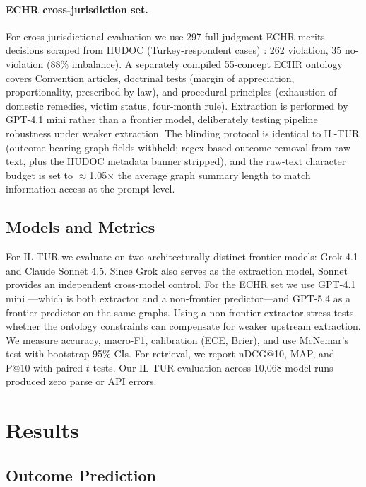 \documentclass[11pt]{article}
\begin{document}
\paragraph{ECHR cross-jurisdiction set.}
For cross-jurisdictional evaluation we use 297 full-judgment ECHR merits decisions scraped from HUDOC (Turkey-respondent cases) \cite{chalkidis2019neural}: 262 violation, 35 no-violation (88\% imbalance). A separately compiled 55-concept ECHR ontology covers Convention articles, doctrinal tests (margin of appreciation, proportionality, prescribed-by-law), and procedural principles (exhaustion of domestic remedies, victim status, four-month rule). Extraction is performed by GPT-4.1 mini \cite{openai2025gpt41} rather than a frontier model, deliberately testing pipeline robustness under weaker extraction. The blinding protocol is identical to IL-TUR (outcome-bearing graph fields withheld; regex-based outcome removal from raw text, plus the HUDOC metadata banner stripped), and the raw-text character budget is set to $\approx$1.05$\times$ the average graph summary length to match information access at the prompt level.

\subsection{Models and Metrics}

For IL-TUR we evaluate on two architecturally distinct frontier models: Grok-4.1 and Claude Sonnet 4.5. Since Grok also serves as the extraction model, Sonnet provides an independent cross-model control. For the ECHR set we use GPT-4.1 mini \cite{openai2025gpt41}---which is both extractor and a non-frontier predictor---and GPT-5.4 \cite{openai2026gpt54} as a frontier predictor on the same graphs. Using a non-frontier extractor stress-tests whether the ontology constraints can compensate for weaker upstream extraction. We measure accuracy, macro-F1, calibration (ECE, Brier), and use McNemar's test with bootstrap 95\% CIs. For retrieval, we report nDCG@10, MAP, and P@10 with paired $t$-tests. Our IL-TUR evaluation across 10,068 model runs produced zero parse or API errors.

\section{Results}
\label{sec:results}

\subsection{Outcome Prediction}
\end{document}
